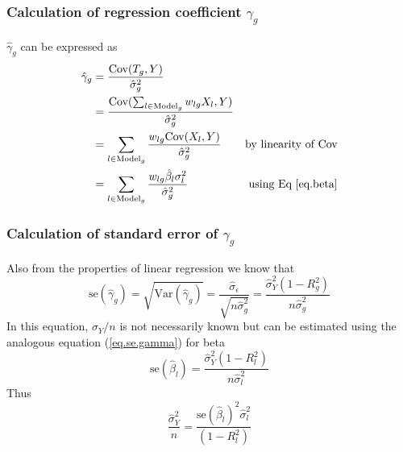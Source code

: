 \documentclass[10pt]{article}
\begin{document}
\subsubsection*{Calculation of regression coefficient $\gamma_g$}

$\hat\gamma_g$ can be expressed as
\begin{align}
\hat \gamma_g & = \frac{ \text{Cov}(T_g,Y) }{ \hat\sigma^2_g } & \nonumber \\
& = \frac{ \text{Cov}(\sum_{l \in \text{Model}_g} w_{lg}X_l,Y) }{ \hat\sigma^2_g } & \nonumber \\
& = \sum_{l\in \text{Model}_g} \frac{w_{lg} \text{Cov}(X_l, Y) }{ \hat\sigma^2_g } & \text{by linearity of Cov} \nonumber \\
& = \sum_{l\in \text{Model}_g} \frac{ w_{lg}\hat\beta_l \sigma^2_l }{ \hat\sigma^2_g } & \text{using Eq \ref{eq.beta}} \label{eq.gamma}
\end{align}

\subsubsection*{Calculation of standard error of $\gamma_g$}
Also from the properties of linear regression we know that 
\begin{equation}
\text{se}(\hat\gamma_g) = \sqrt{\text{Var}(\hat\gamma_g)} = \frac{\hat\sigma_\epsilon}{ \sqrt{n \hat\sigma^2_g} } = \frac{\hat\sigma^2_Y (1-R^2_g)}{n\hat\sigma_g^2} \label{eq.se.gamma}
\end{equation}
In this equation, $\sigma_Y/n$ is not necessarily known but can be estimated using the analogous equation (\ref{eq.se.gamma}) for beta
\begin{equation}
\text{se}(\hat\beta_l) = \frac{\hat\sigma^2_Y (1-R^2_l)}{n\hat\sigma_l^2} \label{eq.se.beta}
\end{equation}
Thus
\begin{equation}
\frac{\hat\sigma_Y^2}{n} = \frac{\text{se}(\hat\beta_l)^2 \hat\sigma_l^2}{(1-R^2_l)} \label{eq.sigYn}
\end{equation}
\end{document}
